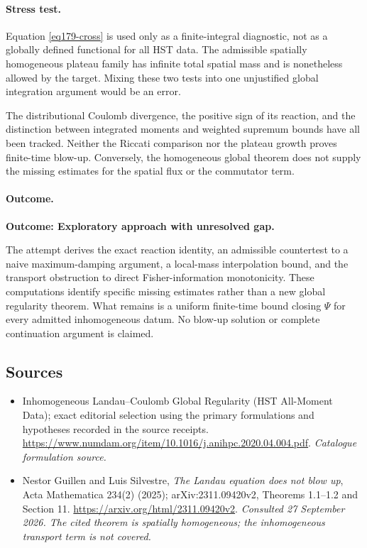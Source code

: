 \documentclass[11pt,a4paper]{article}
\numberwithin{equation}{section}
\begin{document}
\paragraph{Stress test.}
Equation \eqref{eq179-cross} is used only as a finite-integral diagnostic,
not as a globally defined functional for all HST data. The admissible
spatially homogeneous plateau family has infinite total spatial mass and
is nonetheless allowed by the target. Mixing these two tests into one
unjustified global integration argument would be an error.

The distributional Coulomb divergence, the positive sign of its reaction,
and the distinction between integrated moments and weighted supremum
bounds have all been tracked. Neither the Riccati comparison nor the
plateau growth proves finite-time blow-up. Conversely, the homogeneous
global theorem does not supply the missing estimates for the spatial flux
or the commutator term.

\paragraph{Outcome.}
\textbf{Outcome: Exploratory approach with unresolved gap.}

The attempt derives the exact reaction identity, an admissible countertest
to a naive maximum-damping argument, a local-mass interpolation bound, and
the transport obstruction to direct Fisher-information monotonicity.
These computations identify specific missing estimates rather than a new
global regularity theorem. What remains is a uniform finite-time bound
closing $\Psi$ for every admitted inhomogeneous datum. No blow-up solution
or complete continuation argument is claimed.
\subsection{Sources}
\begin{itemize}\raggedright
\item[\textnormal{[S1]}]\hypertarget{source:statement:1}{} Inhomogeneous Landau–Coulomb Global Regularity (HST All-Moment Data); exact editorial selection using the primary formulations and hypotheses recorded in the source receipts.
\url{https://www.numdam.org/item/10.1016/j.anihpc.2020.04.004.pdf}.
{\small\textit{Catalogue formulation source.}}
\item[\textnormal{[E1]}]\hypertarget{extra:statement:1}{} Nestor Guillen and
Luis Silvestre, \emph{The Landau equation does not blow up},
Acta Mathematica 234(2) (2025); arXiv:2311.09420v2,
Theorems 1.1--1.2 and Section 11.
\url{https://arxiv.org/html/2311.09420v2}.
{\small\textit{Consulted 27 September 2026. The cited theorem is
spatially homogeneous; the inhomogeneous transport term is not covered.}}
\end{itemize}
\end{document}
